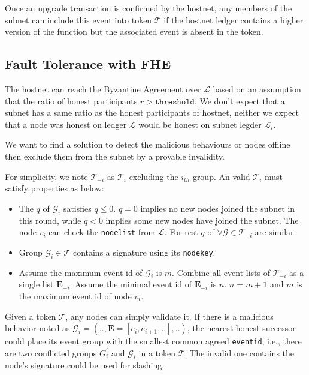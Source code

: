 \documentclass[11pt]{article}
\begin{document}
Once an upgrade transaction is confirmed by the hostnet, any members of the subnet can include this event into token $\mathcal{T}$ if the hostnet ledger contains a higher version of the function but the associated event is absent in the token.

\subsection{Fault Tolerance with FHE}
\label{sec:fault_tolerance}
The hostnet can reach the Byzantine Agreement over $\mathcal{L}$ based on an assumption that the ratio of honest participants $r > \texttt{threshold}$.
We don{'}t expect that a subnet has a same ratio as the honest participants of hostnet, neither we expect that a node was honest on ledger $\mathcal{L}$ would be honest on subnet legder $\mathcal{L}_{i}$.

We want to find a solution to detect the malicious behaviours or nodes offline then exclude them from the subnet by a provable invalidity.

For simplicity, we note $\mathcal{T}_{-i}$ as $\mathcal{T}_{i}$ excluding the $i_{th}$ group. An valid $\mathcal{T}_{i}$ must satisfy properties as below:

\begin{itemize}
\item The $q$ of $\mathcal{G}_{i}$ satisfies \(q \leq 0\). $q=0$ implies no new nodes joined the subnet in this round, while $q < 0$ implies some new nodes have joined the subnet. The node $v_{i}$ can check the \texttt{nodelist} from $\mathcal{L}$.
For rest $q$ of $\forall \mathcal{G} \in \mathcal{T}_{-i}$ are similar.
\item Group $\mathcal{G}_{i} \in \mathcal{T}$ contains a signature using its \texttt{nodekey}.
\item Assume the maximum event id of $\mathcal{G}_{i}$ is $m$. Combine all event lists of $\mathcal{T}_{-i}$ as a single list $\mathbf{E}_{-i}$. Assume the minimal event id of $\mathbf{E}_{-i}$ is $n$.
\(n = m+1\) and $m$ is the maximum event id of node $v_{i}$.
\end{itemize}

Given a token $\mathcal{T}$, any nodes can simply validate it.
If there is a malicious behavior noted as \( \mathcal{G}_{i} = (.., \mathbf{E} = [e_{i}, e_{i+1}, ..], ..) \), the nearest honest successor could place its event group with the smallest common agreed \texttt{eventid}, i.e., there are two conflicted groups $G_{i}^{\prime}$ and $\mathcal{G}_{i}$ in a token $\mathcal{T}$.
The invalid one contains the node's signature could be used for slashing.
\end{document}
